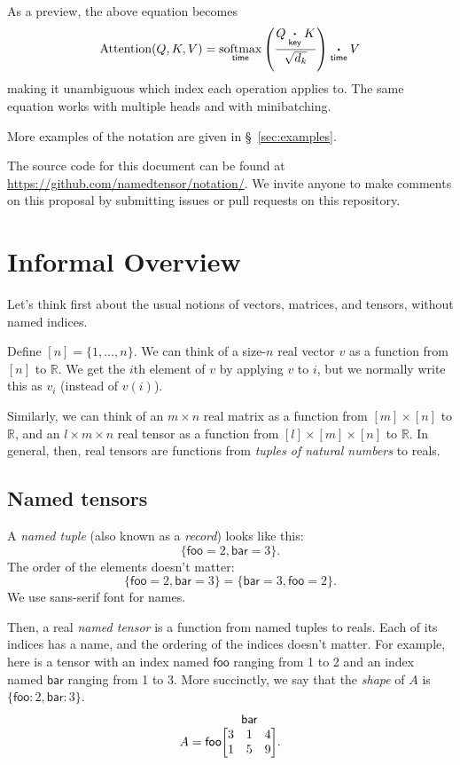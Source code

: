\documentclass{article}
\makeatletter
\newcommand{\name}[1]{\mathsf{#1}}
\newcommand{\nidx}[2]{\name{#1}=#2}
\newcommand{\nset}[2]{\name{#1}:#2}
\newcommand{\ndot}[1]{\mathbin{\mathop{\thinspace\boldsymbol\cdot\thinspace}\limits_{\name{#1}}}}
\newcommand{\nfun}[2]{\mathop{\text{#2}}\limits_{\name{#1}}}
\newcommand{\tuple}[1]{\{ #1\}}
\newcommand{\nmatrix}[3]{\name{#1}\begin{array}[b]{@{}c@{}}\name{#2}\\\begin{bmatrix}#3\end{bmatrix}\end{array}}
\makeatother
\begin{document}
As a preview, the above equation becomes
\begin{equation*}
  \text{Attention}(Q,K,V) = \nfun{time}{softmax} \left( \frac{Q \ndot{key} K}{\sqrt{d_k}} \right) \ndot{time} V
\end{equation*}
making it unambiguous which index each operation applies to. The same equation works with multiple heads and with minibatching.

More examples of the notation are given in \S~\ref{sec:examples}.

The source code for this document can be found at \url{https://github.com/namedtensor/notation/}. We invite anyone to make comments on this proposal by submitting issues or pull requests on this repository.

\section{Informal Overview}
\label{sec:intro}

Let's think first about the usual notions of vectors, matrices, and tensors, without named indices.

Define $[n] = \{1, \ldots, n\}$. We can think of a size-$n$ real vector $v$ as a function from $[n]$ to $\mathbb{R}$. We get the $i$th element of $v$ by applying $v$ to $i$, but we normally write this as $v_i$ (instead of $v(i)$). 

Similarly, we can think of an $m \times n$ real matrix as a function from $[m] \times [n]$ to $\mathbb{R}$, and an $l \times m \times n$ real tensor as a function from $[l] \times [m] \times [n]$ to $\mathbb{R}$. In general, then, real tensors are functions from \emph{tuples of natural numbers} to reals.

\subsection{Named tensors}

A \emph{named tuple} (also known as a \emph{record}) looks like this: \[\tuple{\nidx{foo}{2}, \nidx{bar}{3}}.\] The order of the elements doesn't matter: \[\tuple{\nidx{foo}{2}, \nidx{bar}{3}} = \tuple{\nidx{bar}{3}, \nidx{foo}{2}}.\] We use \textsf{sans-serif} font for names.

Then, a real \emph{named tensor} is a function from named tuples to reals. Each of its indices has a name, and the ordering of the indices doesn't matter. For example, here is a tensor with an index named $\name{foo}$ ranging from 1 to 2 and an index named $\name{bar}$ ranging from 1 to 3. More succinctly, we say that the \emph{shape} of $A$ is $\tuple{\nset{foo}{2}, \nset{bar}{3}}$.
\begin{equation*}
A = \nmatrix{foo}{bar}{
  3 & 1 & 4 \\
  1 & 5 & 9
}.
\end{equation*}
\end{document}
